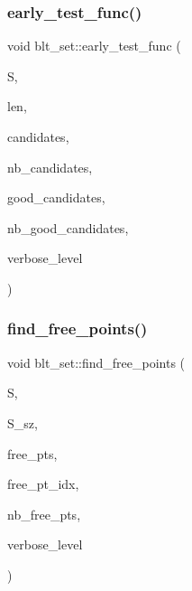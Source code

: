 \subsubsection{\texorpdfstring{early\+\_\+test\+\_\+func()}{early\_test\_func()}}
{\footnotesize\ttfamily void blt\+\_\+set\+::early\+\_\+test\+\_\+func (\begin{DoxyParamCaption}\item[{\mbox{\hyperlink{galois_8h_a09fddde158a3a20bd2dcadb609de11dc}{I\+NT}} $\ast$}]{S,  }\item[{\mbox{\hyperlink{galois_8h_a09fddde158a3a20bd2dcadb609de11dc}{I\+NT}}}]{len,  }\item[{\mbox{\hyperlink{galois_8h_a09fddde158a3a20bd2dcadb609de11dc}{I\+NT}} $\ast$}]{candidates,  }\item[{\mbox{\hyperlink{galois_8h_a09fddde158a3a20bd2dcadb609de11dc}{I\+NT}}}]{nb\+\_\+candidates,  }\item[{\mbox{\hyperlink{galois_8h_a09fddde158a3a20bd2dcadb609de11dc}{I\+NT}} $\ast$}]{good\+\_\+candidates,  }\item[{\mbox{\hyperlink{galois_8h_a09fddde158a3a20bd2dcadb609de11dc}{I\+NT}} \&}]{nb\+\_\+good\+\_\+candidates,  }\item[{\mbox{\hyperlink{galois_8h_a09fddde158a3a20bd2dcadb609de11dc}{I\+NT}}}]{verbose\+\_\+level }\end{DoxyParamCaption})}

\mbox{\label{classblt__set_a71f82dd3dc4a901ea2a0949d2f1af302}} 
\subsubsection{\texorpdfstring{find\+\_\+free\+\_\+points()}{find\_free\_points()}}
{\footnotesize\ttfamily void blt\+\_\+set\+::find\+\_\+free\+\_\+points (\begin{DoxyParamCaption}\item[{\mbox{\hyperlink{galois_8h_a09fddde158a3a20bd2dcadb609de11dc}{I\+NT}} $\ast$}]{S,  }\item[{\mbox{\hyperlink{galois_8h_a09fddde158a3a20bd2dcadb609de11dc}{I\+NT}}}]{S\+\_\+sz,  }\item[{\mbox{\hyperlink{galois_8h_a09fddde158a3a20bd2dcadb609de11dc}{I\+NT}} $\ast$\&}]{free\+\_\+pts,  }\item[{\mbox{\hyperlink{galois_8h_a09fddde158a3a20bd2dcadb609de11dc}{I\+NT}} $\ast$\&}]{free\+\_\+pt\+\_\+idx,  }\item[{\mbox{\hyperlink{galois_8h_a09fddde158a3a20bd2dcadb609de11dc}{I\+NT}} \&}]{nb\+\_\+free\+\_\+pts,  }\item[{\mbox{\hyperlink{galois_8h_a09fddde158a3a20bd2dcadb609de11dc}{I\+NT}}}]{verbose\+\_\+level }\end{DoxyParamCaption})}

